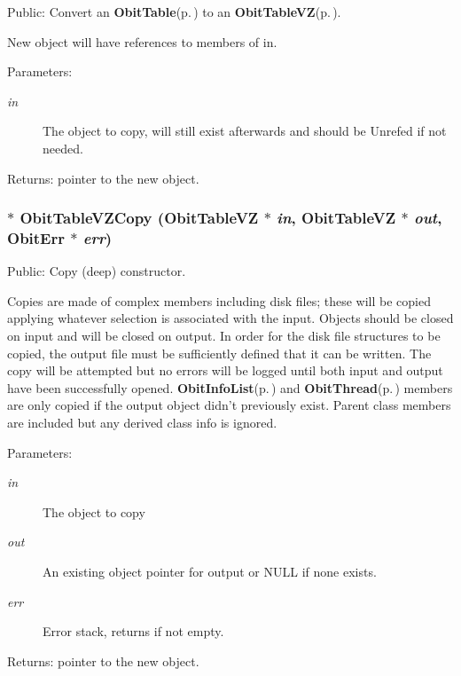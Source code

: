 Public: Convert an {\bf Obit\-Table}{\rm (p.\,\pageref{structObitTable})} to an {\bf Obit\-Table\-VZ}{\rm (p.\,\pageref{structObitTableVZ})}. 

New object will have references to members of in. \begin{Desc}
\item[Parameters:]
\begin{description}
\item[{\em in}]The object to copy, will still exist afterwards and should be Unrefed if not needed. \end{description}
\end{Desc}
\begin{Desc}
\item[Returns:]pointer to the new object. \end{Desc}
\subsubsection{$\ast$ Obit\-Table\-VZCopy ({\bf Obit\-Table\-VZ} $\ast$ {\em in}, {\bf Obit\-Table\-VZ} $\ast$ {\em out}, {\bf Obit\-Err} $\ast$ {\em err})}\label{ObitTableVZ_8h_a14}


Public: Copy (deep) constructor. 

Copies are made of complex members including disk files; these will be copied applying whatever selection is associated with the input. Objects should be closed on input and will be closed on output. In order for the disk file structures to be copied, the output file must be sufficiently defined that it can be written. The copy will be attempted but no errors will be logged until both input and output have been successfully opened. {\bf Obit\-Info\-List}{\rm (p.\,\pageref{structObitInfoList})} and {\bf Obit\-Thread}{\rm (p.\,\pageref{structObitThread})} members are only copied if the output object didn't previously exist. Parent class members are included but any derived class info is ignored. \begin{Desc}
\item[Parameters:]
\begin{description}
\item[{\em in}]The object to copy \item[{\em out}]An existing object pointer for output or NULL if none exists. \item[{\em err}]Error stack, returns if not empty. \end{description}
\end{Desc}
\begin{Desc}
\item[Returns:]pointer to the new object. \end{Desc}
